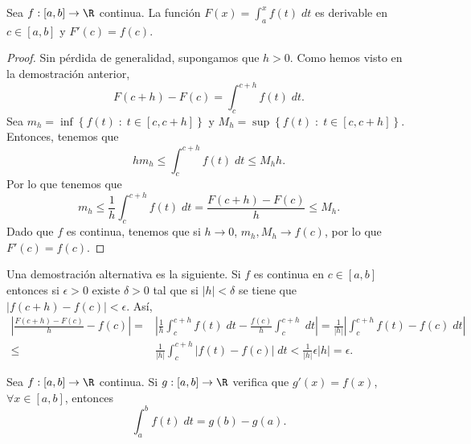 \begin{ftheorem}
	\normalfont Sea $\displaystyle f : [a,b] \to \R$ continua. La función $\displaystyle F\left(x\right) = \int^{x}_{a} f\left(t\right) \; dt $ es derivable en $\displaystyle c \in \left[a,b\right]  $ y $\displaystyle F'\left(c\right) = f\left(c\right) $.  
\end{ftheorem}
\begin{proof}
Sin pérdida de generalidad, supongamos que $\displaystyle h > 0 $. Como hemos visto en la demostración anterior,
\[F\left(c + h\right)-F\left(c\right) = \int^{c + h}_{c} f\left(t\right) \; dt .\]
Sea $\displaystyle m_{h} = \inf \left\{ f\left(t\right) \; : \; t  \in \left[c, c + h\right]\right\}  $ y $\displaystyle M_{h} = \sup \left\{ f\left(t\right) \; : \; t \in \left[c, c+h\right]\right\}  $. Entonces, tenemos que
\[hm_{h} \leq \int^{c + h}_{c } f\left(t\right) \; dt \leq M_{h}h .\]
Por lo que tenemos que
\[m_{h} \leq \frac{1}{h}\int^{c+h}_{c} f\left(t\right) \; dt = \frac{F\left(c+h\right)-F\left(c\right)}{h} \leq M_{h} .\]
Dado que $\displaystyle f $ es continua, tenemos que si $\displaystyle h\to0 $, $\displaystyle m_{h}, M_{h} \to f\left(c\right) $, por lo que $\displaystyle F'\left(c\right) = f\left(c\right) $.
\end{proof}
\begin{observation}
	\normalfont Una demostración alternativa es la siguiente. Si $\displaystyle f $ es continua en $\displaystyle c \in \left[a,b\right]  $ entonces si $\displaystyle \epsilon > 0 $ existe $\displaystyle \delta > 0 $ tal que si $\displaystyle \left|h\right| < \delta  $ se tiene que $\displaystyle \left|f\left(c + h\right)-f\left(c\right)\right|<\epsilon  $. Así,
\[
\begin{split}
	\left|\frac{F\left(c+h\right)-F\left(c\right)}{h}-f\left(c\right)\right| = & \left|\frac{1}{h}\int^{c+h}_{c} f\left(t\right) \; dt - \frac{f\left(c\right)}{h}\int^{c+h}_{c}  \; dt\right| = \frac{1}{ \left|h\right|} \left|\int^{c+h}_{c} f\left(t\right)-f\left(c\right) \; dt\right|\\
	\leq & \frac{1}{ \left|h\right|}\int^{c+h}_{c} \left|f\left(t\right)-f\left(c\right)\right| \; dt < \frac{1}{ \left|h\right|} \epsilon \left|h\right| = \epsilon.
\end{split}
\]
	
\end{observation}
\begin{fcolorary}
	\normalfont Sea $\displaystyle f : \left[a,b\right] \to \R $ continua. Si $\displaystyle g : \left[a,b\right] \to \R $ verifica que $\displaystyle g'\left(x\right) = f\left(x\right) $, $\displaystyle \forall x \in \left[a,b\right]  $, entonces
	\[ \int^{b}_{a} f\left(t\right) \; dt = g\left(b\right)-g\left(a\right) .\]
\end{fcolorary}
